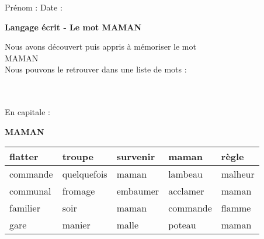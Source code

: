\documentclass[a4paper, 11pt,oneside, fleqn]{article}
\begin{document}
\newcommand{\x}{\times}
\renewcommand{\arraystretch}{1.5}

\sloppy
\pagestyle{empty}
\begin{onehalfspace}


\sffamily \noindent \Large Pr\'enom : \fbox{\begin{minipage}{9cm} \vspace{1.2cm}\hspace{9cm} \end{minipage}} \hspace{1.5cm}\Large Date :\vspace{2mm}\\
\begin{minipage}{12cm}
\begin{center}
\Large\textbf{Langage \'ecrit - Le mot \MakeUppercase{maman}}
\end{center}
\normalsize Nous avons d\'ecouvert puis appris \`a m\'emoriser le mot\\
\MakeUppercase{maman}\\
Nous pouvons le retrouver dans une liste de mots : \end{minipage}\\
\vspace{0.25cm}\\
 
\large\noindent En capitale :
\begin{center}
{\huge \textbf{\MakeUppercase{maman}}}
\vspace{0.25cm}\\
\begin{tabulary}{17cm}{|g|g|g|g|g|}
\hline
flatter & troupe & survenir & maman & règle \\
\hline
commande & quelquefois & maman & lambeau & malheur \\
\hline
communal & fromage & embaumer & acclamer & maman \\
\hline
familier & soir & maman & commande & flamme \\
\hline
gare & manier & malle & poteau & maman \\
\hline
\end{tabulary}
\end{center}
\vspace{0.5cm}


\end{onehalfspace}
\end{document}
